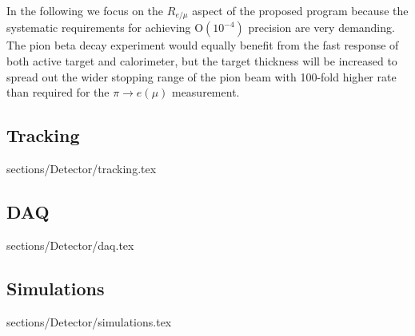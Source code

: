In the following we focus on the $R_{e/\mu}$ aspect of the proposed program because the systematic
requirements for achieving O$(10^{-4})$ precision are very demanding. The pion beta decay experiment
would equally benefit from the fast response of both active target and calorimeter, but the 
target thickness will be increased to spread out the wider stopping range of the 
pion beam with 100-fold higher rate than required for the $\pi \rightarrow e(\mu)$ measurement. 












\subsection{Tracking}
 {sections/Detector/tracking.tex}
\subsection{DAQ}
 {sections/Detector/daq.tex}
\subsection{Simulations}
 {sections/Detector/simulations.tex}